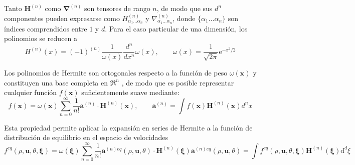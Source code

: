 Tanto $\bm{H}^{(n)}$ como $\bm{\nabla}^{(n)}$ son tensores de rango $n$, de modo que sus $d^n$ componentes pueden expresarse como $H^{(n)}_{\alpha_1 \ldots \alpha_n}$ y $\nabla^{(n)}_{\alpha_1 \ldots \alpha_n}$, donde $\{\alpha_1 \ldots \alpha_n\}$ son \'indices comprendidos entre $1$ y $d$. Para el caso particular de una dimensi\'on, los polinomios se reducen a
\begin{equation}
	H^{(n)}(x)=(-1)^{(n)} \dfrac{1}{\omega(x)} \dfrac{d^n}{dx^n}\omega(x), \qquad 
	\omega(x) = \dfrac{1}{\sqrt{2\pi}}\mbox{e}^{-x^2/2}
\end{equation}

Los polinomios de Hermite son ortogonales respecto a la funci\'on de peso $\omega(\bm{x})$ y constituyen una base completa en $\Re^n$ \cite{wiener_fourier_1989}, de modo que es posible representar cualquier funci\'on $f(\bm{x})$ suficientemente suave mediante:
\begin{equation}
	f(\bm{x}) = \omega(\bm{x}) \sum_{n=0}^{\infty}\dfrac{1}{n!}\bm{a}^{(n)} \cdot \bm{H}^{(n)}(\bm{x}), \qquad 
	\bm{a}^{(n)} = \int f(\bm{x})\bm{H}^{(n)}(\bm{x}) d^nx
\end{equation}

Esta propiedad permite aplicar la expansi\'on en series de Hermite a la funci\'on de distribuci\'on de equilibrio en el espacio de velocidades
\begin{subequations}
	\begin{equation}
		f^{eq}(\rho, \bm{u}, \theta, \bm{\xi}) = \omega(\bm{\xi}) \sum_{n=0}^{\infty}\dfrac{1}{n!}\bm{a}^{(n)eq}(\rho, \bm{u}, \theta) \cdot \bm{H}^{(n)}(\bm{\xi})
	\end{equation}
	\begin{equation}
		\bm{a}^{(n)eq}(\rho, \bm{u}, \theta) = \int f^{eq}(\rho, \bm{u}, \theta, \bm{\xi})\bm{H}^{(n)}(\bm{\xi}) \mbox{d}^d \xi
	\end{equation}
	\label{eq:feq_hermite}
\end{subequations}

